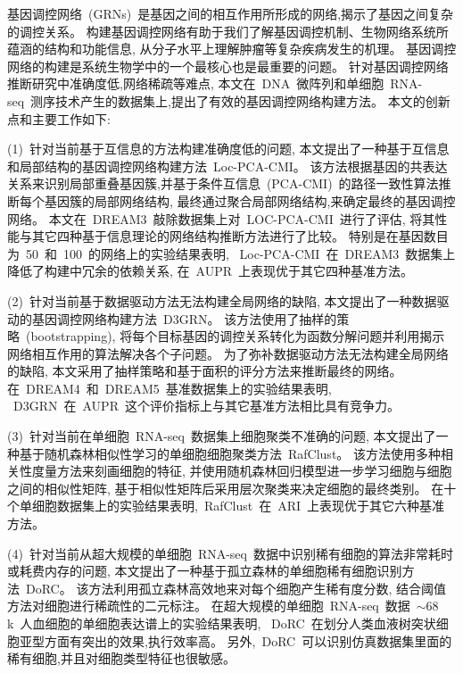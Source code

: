 \begin{abstractcn}\setlength{\baselineskip}{20pt}%
基因调控网络~(GRNs)~是基因之间的相互作用所形成的网络,揭示了基因之间复杂的调控关系。
构建基因调控网络有助于我们了解基因调控机制、生物网络系统所蕴涵的结构和功能信息,
从分子水平上理解肿瘤等复杂疾病发生的机理。
基因调控网络的构建是系统生物学中的一个最核心也是最重要的问题。
针对基因调控网络推断研究中准确度低,网络稀疏等难点, 
本文在~DNA~微阵列和单细胞~RNA-seq~测序技术产生的数据集上,提出了有效的基因调控网络构建方法。
本文的创新点和主要工作如下:

(1)~针对当前基于互信息的方法构建准确度低的问题,
本文提出了一种基于互信息和局部结构的基因调控网络构建方法~Loc-PCA-CMI。
该方法根据基因的共表达关系来识别局部重叠基因簇,并基于条件互信息~(PCA-CMI)~的路径一致性算法推断每个基因簇的局部网络结构,
最终通过聚合局部网络结构,来确定最终的基因调控网络。
本文在~DREAM3~敲除数据集上对~LOC-PCA-CMI~进行了评估,
将其性能与其它四种基于信息理论的网络结构推断方法进行了比较。
特别是在基因数目为~50~和~100~的网络上的实验结果表明,
~Loc-PCA-CMI~在~DREAM3~数据集上降低了构建中冗余的依赖关系,
在~AUPR~上表现优于其它四种基准方法。

(2)~针对当前基于数据驱动方法无法构建全局网络的缺陷,
本文提出了一种数据驱动的基因调控网络构建方法~D3GRN。
该方法使用了抽样的策略~(bootstrapping),
将每个目标基因的调控关系转化为函数分解问题并利用揭示网络相互作用的算法解决各个子问题。
为了弥补数据驱动方法无法构建全局网络的缺陷,
本文采用了抽样策略和基于面积的评分方法来推断最终的网络。
在~DREAM4~和~DREAM5~基准数据集上的实验结果表明,
~D3GRN~在~AUPR~这个评价指标上与其它基准方法相比具有竞争力。

(3)~针对当前在单细胞~RNA-seq~数据集上细胞聚类不准确的问题,
本文提出了一种基于随机森林相似性学习的单细胞细胞聚类方法~RafClust。
该方法使用多种相关性度量方法来刻画细胞的特征, 
并使用随机森林回归模型进一步学习细胞与细胞之间的相似性矩阵,
基于相似性矩阵后采用层次聚类来决定细胞的最终类别。
在十个单细胞数据集上的实验结果表明,~RafClust~在~ARI~上表现优于其它六种基准方法。

(4)~针对当前从超大规模的单细胞~RNA-seq~数据中识别稀有细胞的算法非常耗时或耗费内存的问题,
本文提出了一种基于孤立森林的单细胞稀有细胞识别方法~DoRC。
该方法利用孤立森林高效地来对每个细胞产生稀有度分数,
结合阈值方法对细胞进行稀疏性的二元标注。
在超大规模的单细胞~RNA-seq~数据~${\sim}68$k~人血细胞的单细胞表达谱上的实验结果表明,
~DoRC~在划分人类血液树突状细胞亚型方面有突出的效果,执行效率高。
另外,~DoRC~可以识别仿真数据集里面的稀有细胞,并且对细胞类型特征也很敏感。


\end{abstractcn}
